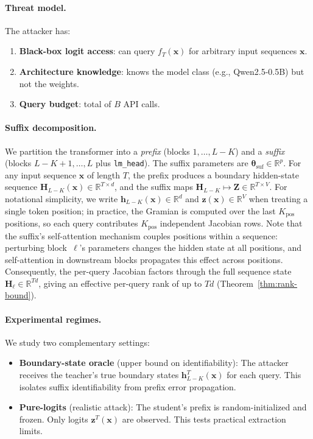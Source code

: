 \documentclass{article}
\newcommand{\R}{\mathbb{R}}
\newcommand{\btheta}{\boldsymbol{\theta}}
\newcommand{\bz}{\mathbf{z}}
\newcommand{\bh}{\mathbf{h}}
\newcommand{\bx}{\mathbf{x}}
\newcommand{\bH}{\mathbf{H}}
\newcommand{\bZ}{\mathbf{Z}}
\begin{document}
\paragraph{Threat model.}
The attacker has:
\begin{enumerate}
    \item \textbf{Black-box logit access}: can query $f_T(\bx)$ for arbitrary input sequences $\bx$.
    \item \textbf{Architecture knowledge}: knows the model class (e.g., Qwen2.5-0.5B) but not the weights.
    \item \textbf{Query budget}: total of $B$ API calls.
\end{enumerate}

\paragraph{Suffix decomposition.}
We partition the transformer into a \emph{prefix} (blocks $1, \ldots, L-K$) and a \emph{suffix} (blocks $L-K+1, \ldots, L$ plus \texttt{lm\_head}). The suffix parameters are $\btheta_{\text{suf}} \in \R^p$. For any input sequence $\bx$ of length $T$, the prefix produces a boundary hidden-state sequence $\bH_{L-K}(\bx) \in \R^{T \times d}$, and the suffix maps $\bH_{L-K} \mapsto \bZ \in \R^{T \times V}$.  For notational simplicity, we write $\bh_{L-K}(\bx) \in \R^d$ and $\bz(\bx) \in \R^V$ when treating a single token position; in practice, the Gramian is computed over the last $K_{\text{pos}}$ positions, so each query contributes $K_{\text{pos}}$ independent Jacobian rows.  Note that the suffix's self-attention mechanism couples positions within a sequence: perturbing block~$\ell$'s parameters changes the hidden state at all positions, and self-attention in downstream blocks propagates this effect across positions.  Consequently, the per-query Jacobian factors through the full sequence state $\bH_\ell \in \R^{Td}$, giving an effective per-query rank of up to $Td$ (Theorem~\ref{thm:rank-bound}).

\paragraph{Experimental regimes.}
We study two complementary settings:

\begin{itemize}
    \item \textbf{Boundary-state oracle} (upper bound on identifiability): The attacker receives the teacher's true boundary states $\bh^T_{L-K}(\bx)$ for each query. This isolates suffix identifiability from prefix error propagation.
    \item \textbf{Pure-logits} (realistic attack): The student's prefix is random-initialized and frozen. Only logits $\bz^T(\bx)$ are observed. This tests practical extraction limits.
\end{itemize}
\end{document}
